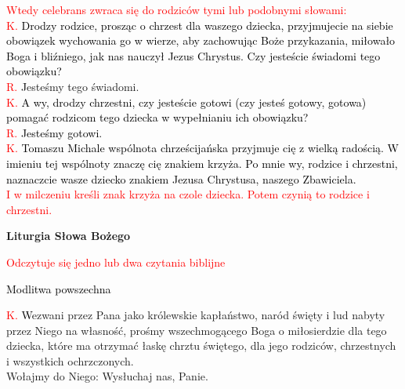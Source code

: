 \documentclass[11pt, a5paper]{extarticle}
\begin{document}
\noindent\textcolor{red} {Wtedy celebrans zwraca się do rodziców tymi lub podobnymi słowami:} \\
\textcolor{red}{K.} \textcolor{black} {Drodzy rodzice, prosząc o chrzest dla waszego dziecka, przyjmujecie na siebie obowiązek wychowania go w wierze, aby zachowując Boże przykazania, miłowało Boga i bliźniego, jak nas nauczył Jezus Chrystus. Czy jesteście świadomi tego obowiązku?} \\
\textcolor{red}{R.} \textcolor{black} Jesteśmy tego świadomi.\\
\textcolor{red}{K.} \textcolor{black}{A wy, drodzy chrzestni, czy jesteście gotowi (czy jesteś gotowy, gotowa) pomagać rodzicom tego dziecka w wypełnianiu ich obowiązku?}\\
\textcolor{red}{R.} \textcolor{black}{Jesteśmy gotowi.} \\
\textcolor{red}{K.} \textcolor{black}{Tomaszu Michale wspólnota chrześcijańska przyjmuje cię z wielką radością. W imieniu tej wspólnoty znaczę cię znakiem krzyża. Po mnie wy, rodzice i chrzestni, naznaczcie wasze dziecko znakiem Jezusa Chrystusa, naszego Zbawiciela.}\\
\indent\textcolor{red}{I w milczeniu kreśli znak krzyża na czole dziecka. Potem czynią to rodzice i chrzestni.}\\

\begin{center}
\Large
\textbf{Liturgia Słowa Bożego} \\

\normalsize
\end{center}
\textcolor{red}{Odczytuje się jedno lub dwa czytania biblijne}\\
\begin{center}
\Large
\noindent\textcolor{black}{Modlitwa powszechna}
\end{center}
\textcolor{red}{K.} \textcolor{black}Wezwani przez Pana jako królewskie kapłaństwo, naród święty i lud nabyty przez Niego na własność, prośmy wszechmogącego Boga o miłosierdzie dla tego dziecka, które ma otrzymać łaskę chrztu świętego, dla jego rodziców, chrzestnych i wszystkich ochrzczonych. \\
Wołajmy do Niego: Wysłuchaj nas, Panie. \\
\end{document}
